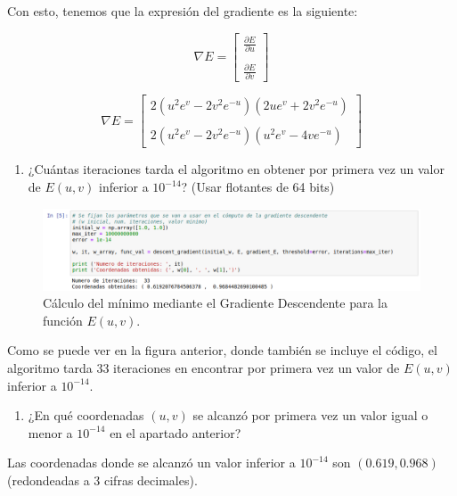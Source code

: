 \documentclass[11pt,a4paper]{article}
\begin{document}
Con esto, tenemos que la expresión del gradiente es la siguiente:

\begin{equation}
\nabla E =
\left[
{
\begin{array}{c}
	\frac{\partial E}{\partial u} \\
	\\
	\frac{\partial E}{\partial v}
\end{array}
}
\right]
\end{equation}

\begin{equation}
\nabla E =
\left[
{
\begin{array}{c}
	2(u^2 e^v - 2 v^2 e^{-u})(2ue^v + 2 v^2 e^{-u}) \\
	\\
	2(u^2 e^v - 2 v^2 e^{-u})(u^2 e^v -4 v e^{-u})
\end{array}
}
\right]
\end{equation}

\begin{enumerate}[resume, label=\alph*)]
	\item ¿Cuántas iteraciones tarda el algoritmo en obtener por primera vez un valor de $E(u, v)$ inferior a $10^{-14}$?
	(Usar flotantes de 64 bits)
\end{enumerate}

\begin{figure}[H]
\centering
\includegraphics[scale=0.4]{img/jnbook_ej_2.png}
\caption{Cálculo del mínimo mediante el Gradiente Descendente para la función $E(u, v)$.}
\end{figure}

Como se puede ver en la figura anterior, donde también se incluye el código, el algoritmo tarda 33 iteraciones en encontrar
por primera vez un valor de $E(u, v)$ inferior a $10^{-14}$.

\begin{enumerate}[resume, label=\alph*)]
	\item ¿En qué coordenadas $(u, v)$ se alcanzó por primera vez un valor igual o menor a $10^{-14}$ en el apartado anterior?
\end{enumerate}

Las coordenadas donde se alcanzó un valor inferior a $10^{-14}$ son $(0.619, 0.968)$ (redondeadas a 3 cifras decimales).
\end{document}
